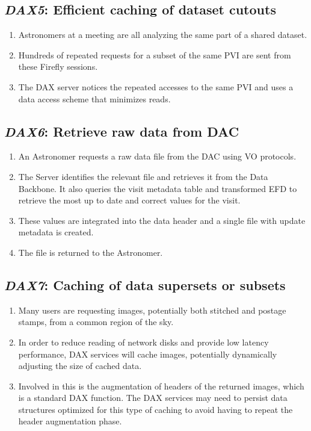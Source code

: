 \documentclass[DM,toc,lsstdraft]{lsstdoc}
\newcommand{\usecase}[3]{%
\subsection{\emph{#1}: #2}
\label{use:#1}
\begin{enumerate}[label=\alph*.]
#3
\end{enumerate}
}
\begin{document}
\usecase{DAX5}{Efficient caching of dataset cutouts}{%

\item
Astronomers at a meeting are all analyzing the same part of a shared dataset.

\item
Hundreds of repeated requests for a subset of the same PVI are sent from these Firefly sessions.

\item
The DAX server notices the repeated accesses to the same PVI and uses a data access scheme that minimizes reads.

}

\usecase{DAX6}{Retrieve raw data from DAC}{%

\item
An Astronomer requests a raw data file from the DAC using VO protocols.

\item
The Server identifies the relevant file and retrieves it from the Data Backbone.
It also queries the visit metadata table and transformed EFD to retrieve the most up to date and correct values for the visit.

\item
These values are integrated into the data header and a single file with update metadata is created.

\item
The file is returned to the Astronomer.

}

\usecase{DAX7}{Caching of data supersets or subsets}{%

\item
Many users are requesting images, potentially both stitched and postage stamps, from a common region of the sky.

\item
In order to reduce reading of network disks and provide low latency performance, DAX services will cache images, potentially dynamically adjusting the size of cached data.

\item
Involved in this is the augmentation of headers of the returned images, which is a standard DAX function.
The DAX services may need to persist data structures optimized for this type of caching to avoid having to repeat the header augmentation phase.

}
\end{document}
